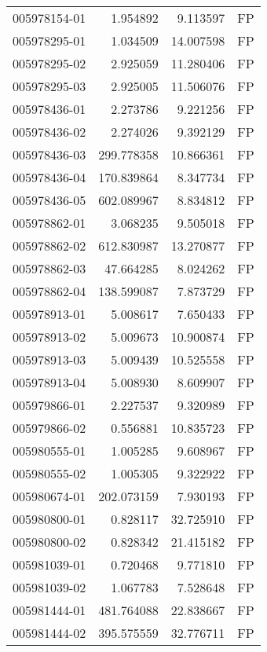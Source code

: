 \begin{tabular}{lrrl}
005978154-01 &    1.954892 &       9.113597 &   FP \\
005978295-01 &    1.034509 &      14.007598 &   FP \\
005978295-02 &    2.925059 &      11.280406 &   FP \\
005978295-03 &    2.925005 &      11.506076 &   FP \\
005978436-01 &    2.273786 &       9.221256 &   FP \\
005978436-02 &    2.274026 &       9.392129 &   FP \\
005978436-03 &  299.778358 &      10.866361 &   FP \\
005978436-04 &  170.839864 &       8.347734 &   FP \\
005978436-05 &  602.089967 &       8.834812 &   FP \\
005978862-01 &    3.068235 &       9.505018 &   FP \\
005978862-02 &  612.830987 &      13.270877 &   FP \\
005978862-03 &   47.664285 &       8.024262 &   FP \\
005978862-04 &  138.599087 &       7.873729 &   FP \\
005978913-01 &    5.008617 &       7.650433 &   FP \\
005978913-02 &    5.009673 &      10.900874 &   FP \\
005978913-03 &    5.009439 &      10.525558 &   FP \\
005978913-04 &    5.008930 &       8.609907 &   FP \\
005979866-01 &    2.227537 &       9.320989 &   FP \\
005979866-02 &    0.556881 &      10.835723 &   FP \\
005980555-01 &    1.005285 &       9.608967 &   FP \\
005980555-02 &    1.005305 &       9.322922 &   FP \\
005980674-01 &  202.073159 &       7.930193 &   FP \\
005980800-01 &    0.828117 &      32.725910 &   FP \\
005980800-02 &    0.828342 &      21.415182 &   FP \\
005981039-01 &    0.720468 &       9.771810 &   FP \\
005981039-02 &    1.067783 &       7.528648 &   FP \\
005981444-01 &  481.764088 &      22.838667 &   FP \\
005981444-02 &  395.575559 &      32.776711 &   FP \\

\end{tabular}
